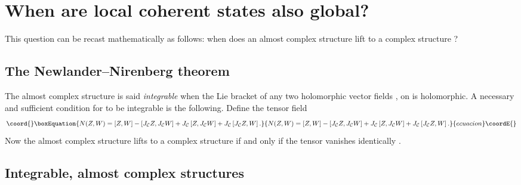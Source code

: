 \documentclass[a4paper,a4paper]{article}
\begin{document}
\section{When are local coherent states also global?}\label{when}

This question can be recast mathematically as follows: when does an almost 
complex structure \coordHE{} lift to a complex structure \coordHE{}? 

\subsection{The Newlander--Nirenberg theorem}\label{nnt}

The almost complex structure \coordHE{} is said {\it integrable} 
when the Lie bracket \myHighlight{$[Z, W]$}\coordHE{} of any two holomorphic vector fields \coordHE{}, \coordHE{} 
on \coordHE{} is holomorphic. A necessary and sufficient condition for 
\coordHE{} 
to be integrable is the following. Define the tensor field \coordHE{}
\begin{equation}\coord{}\boxEquation{
N(Z,W)=\left[Z,W\right] - \left[J_{\cal C}Z,J_{\cal C}W\right] 
+J_{\cal C}\left[Z, J_{\cal C}W\right] + J_{\cal C}\left[J_{\cal C}Z, W\right].
\label{tors}
}{
N(Z,W)=\left[Z,W\right] - \left[J_{\cal C}Z,J_{\cal C}W\right] 
+J_{\cal C}\left[Z, J_{\cal C}W\right] + J_{\cal C}\left[J_{\cal C}Z, W\right].
}{ecuacion}\coordE{}\end{equation}
Now the almost complex structure \coordHE{} lifts to a complex structure 
\coordHE{} if and only if the tensor \coordHE{} vanishes identically 
\cite{NN}.

\subsection{Integrable, almost complex structures}\label{cpsm}
\end{document}

